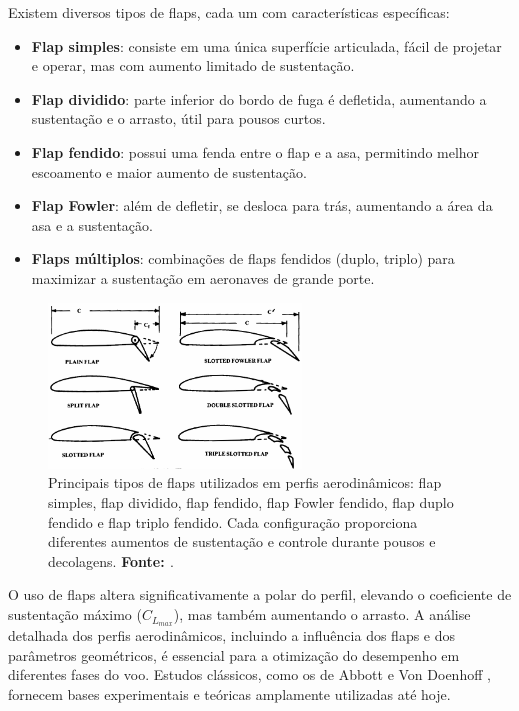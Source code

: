 Existem diversos tipos de flaps, cada um com características específicas:

\begin{itemize}
    \item \textbf{Flap simples}: consiste em uma única superfície articulada, fácil de projetar e operar, mas com aumento limitado de sustentação.
    \item \textbf{Flap dividido}: parte inferior do bordo de fuga é defletida, aumentando a sustentação e o arrasto, útil para pousos curtos.
    \item \textbf{Flap fendido}: possui uma fenda entre o flap e a asa, permitindo melhor escoamento e maior aumento de sustentação.
    \item \textbf{Flap Fowler}: além de defletir, se desloca para trás, aumentando a área da asa e a sustentação.
    \item \textbf{Flaps múltiplos}: combinações de flaps fendidos (duplo, triplo) para maximizar a sustentação em aeronaves de grande porte.
\end{itemize}

\begin{figure}[H]
    \centering
    \includegraphics[width=0.6\textwidth]{figures/perfil_flap.png}
    \caption{Principais tipos de flaps utilizados em perfis aerodinâmicos: flap simples, flap dividido, flap fendido, flap Fowler fendido, flap duplo fendido e flap triplo fendido. Cada configuração proporciona diferentes aumentos de sustentação e controle durante pousos e decolagens. \textbf{Fonte: \cite{raymer2018aircraft}}.}
    \label{fig:perfil_flap}
\end{figure}

O uso de flaps altera significativamente a polar do perfil, elevando o coeficiente de sustentação máximo (\(C_{L_{max}}\)), mas também aumentando o arrasto. A análise detalhada dos perfis aerodinâmicos, incluindo a influência dos flaps e dos parâmetros geométricos, é essencial para a otimização do desempenho em diferentes fases do voo. Estudos clássicos, como os de Abbott e Von Doenhoff \cite{abbott1959theory}, fornecem bases experimentais e teóricas amplamente utilizadas até hoje.

